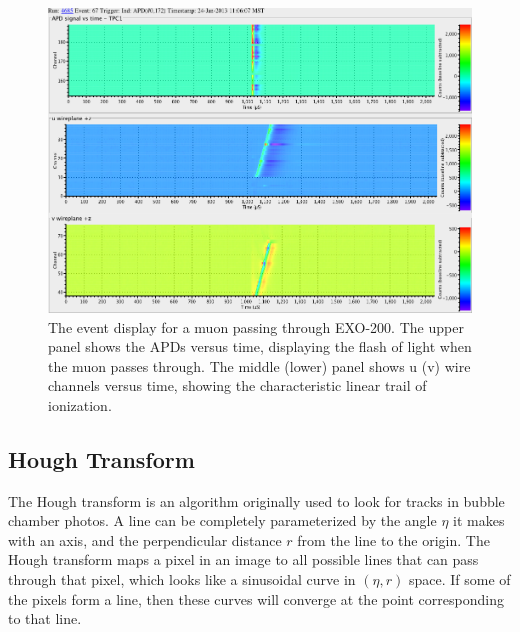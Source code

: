 \documentclass[herrin-thesis.tex]{subfiles}
\begin{document}
\begin{figure}[htbp]
\centering
\includegraphics[width=1\columnwidth]{./plots/muon_eventdisplay_run_4685_ev_67.png}
\caption[A muon passing through EXO-200]{The event display for a muon passing through EXO-200. The upper panel shows the APDs versus time, displaying the flash of light when the muon passes through. The middle (lower) panel shows u (v) wire channels versus time, showing the characteristic linear trail of ionization.}
\label{fig:muon:eventdisplay}
\end{figure}

\subsection{Hough Transform}
The Hough transform\cite{Hough:1959fk}\cite{Duda:1972:UHT:361237.361242} is an algorithm originally used to look for tracks in bubble chamber photos. A line can be completely parameterized by the angle \(\eta\) it makes with an axis, and the perpendicular distance \(r\) from the line to the origin. The Hough transform maps a pixel in an image to all possible lines that can pass through that pixel, which looks like a sinusoidal curve in \((\eta, r)\) space. If some of the pixels form a line, then these curves will converge at the point corresponding to that line.
\end{document}

